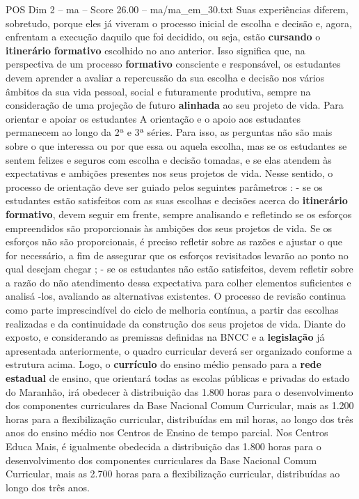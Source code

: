 \begin{textsample}{POS Dim 2 – ma – Score 26.00 – ma/ma\_em\_30.txt}
Suas experiências diferem, sobretudo, porque eles já viveram o processo inicial de escolha e decisão e, agora, enfrentam a execução daquilo que foi decidido, ou seja, estão \textbf{cursando} o \textbf{itinerário} \textbf{formativo} escolhido no ano anterior.
Isso significa que, na perspectiva de um processo \textbf{formativo} consciente e responsável, os estudantes devem aprender a avaliar a repercussão da sua escolha e decisão nos vários âmbitos da sua vida pessoal, social e futuramente produtiva, sempre na consideração de uma projeção de futuro \textbf{alinhada} ao seu projeto de vida.
Para orientar e apoiar os estudantes A orientação e o apoio aos estudantes permanecem ao longo da 2ª e 3ª séries.
Para isso, as perguntas não são mais sobre o que interessa ou por que essa ou aquela escolha, mas se os estudantes se sentem felizes e seguros com escolha e decisão tomadas, e se elas atendem às expectativas e ambições presentes nos seus projetos de vida.
Nesse sentido, o processo de orientação deve ser guiado pelos seguintes parâmetros : - se os estudantes estão satisfeitos com as suas escolhas e decisões acerca do \textbf{itinerário} \textbf{formativo}, devem seguir em frente, sempre analisando e refletindo se os esforços empreendidos são proporcionais às ambições dos seus projetos de vida.
Se os esforços não são proporcionais, é preciso refletir sobre as razões e ajustar o que for necessário, a fim de assegurar que os esforços revisitados levarão ao ponto no qual desejam chegar ; - se os estudantes não estão satisfeitos, devem refletir sobre a razão do não atendimento dessa expectativa para colher elementos suficientes e analisá -los, avaliando as alternativas existentes.
O processo de revisão continua como parte imprescindível do ciclo de melhoria contínua, a partir das escolhas realizadas e da continuidade da construção dos seus projetos de vida.
Diante do exposto, e considerando as premissas definidas na BNCC e a \textbf{legislação} já apresentada anteriormente, o quadro curricular deverá ser organizado conforme a estrutura acima.
Logo, o \textbf{currículo} do ensino médio pensado para a \textbf{rede} \textbf{estadual} de ensino, que orientará todas as escolas públicas e privadas do estado do Maranhão, irá obedecer à distribuição das 1.800 horas para o desenvolvimento dos componentes curriculares da Base Nacional Comum Curricular, mais as 1.200 horas para a flexibilização curricular, distribuídas em mil horas, ao longo dos três anos do ensino médio nos Centros de Ensino de tempo parcial.
Nos Centros Educa Mais, é igualmente obedecida a distribuição das 1.800 horas para o desenvolvimento dos componentes curriculares da Base Nacional Comum Curricular, mais as 2.700 horas para a flexibilização curricular, distribuídas ao longo dos três anos.

\end{textsample}
